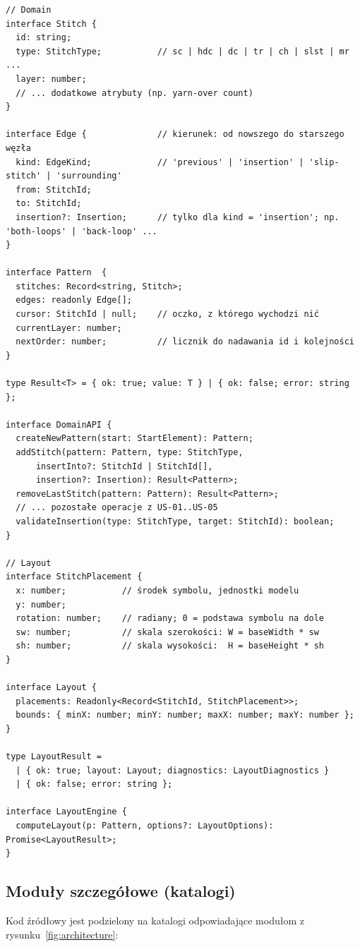 \documentclass[a4paper,11pt]{article}
\begin{document}
\begin{verbatim}
// Domain
interface Stitch {
  id: string;
  type: StitchType;           // sc | hdc | dc | tr | ch | slst | mr ...
  layer: number;
  // ... dodatkowe atrybuty (np. yarn-over count)
}

interface Edge {              // kierunek: od nowszego do starszego węzła
  kind: EdgeKind;             // 'previous' | 'insertion' | 'slip-stitch' | 'surrounding'
  from: StitchId;             
  to: StitchId;
  insertion?: Insertion;      // tylko dla kind = 'insertion'; np. 'both-loops' | 'back-loop' ...
}

interface Pattern  {
  stitches: Record<string, Stitch>;
  edges: readonly Edge[];
  cursor: StitchId | null;    // oczko, z którego wychodzi nić
  currentLayer: number;
  nextOrder: number;          // licznik do nadawania id i kolejności
}

type Result<T> = { ok: true; value: T } | { ok: false; error: string };

interface DomainAPI {
  createNewPattern(start: StartElement): Pattern;
  addStitch(pattern: Pattern, type: StitchType, 
      insertInto?: StitchId | StitchId[],
      insertion?: Insertion): Result<Pattern>;
  removeLastStitch(pattern: Pattern): Result<Pattern>;
  // ... pozostałe operacje z US-01..US-05
  validateInsertion(type: StitchType, target: StitchId): boolean;
}

// Layout
interface StitchPlacement {
  x: number;           // środek symbolu, jednostki modelu
  y: number;
  rotation: number;    // radiany; 0 = podstawa symbolu na dole
  sw: number;          // skala szerokości: W = baseWidth * sw
  sh: number;          // skala wysokości:  H = baseHeight * sh
}

interface Layout {
  placements: Readonly<Record<StitchId, StitchPlacement>>;
  bounds: { minX: number; minY: number; maxX: number; maxY: number };
}

type LayoutResult =
  | { ok: true; layout: Layout; diagnostics: LayoutDiagnostics }
  | { ok: false; error: string };

interface LayoutEngine {
  computeLayout(p: Pattern, options?: LayoutOptions): Promise<LayoutResult>;
}
\end{verbatim}

\subsection{Moduły szczegółowe (katalogi)}

Kod źródłowy jest podzielony na katalogi odpowiadające modułom z rysunku~\ref{fig:architecture}:
\end{document}
